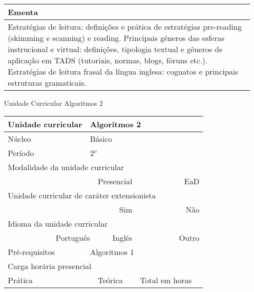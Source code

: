 \begin{quadro}[h!]
\begin{tabular}{|p{3cm} p{2cm} p{3cm} p{2cm} p{3cm} p{2cm}|}
\multicolumn{6}{|p{15cm}|}{\cellcolor{blue1} Ementa} \\\hline
\hline\multicolumn{6}{|p{15cm}|}{\scriptsize  Estratégias de leitura: definições e prática de estratégias pre-reading (skimming e scanning) e reading. Principais gêneros das esferas instrucional e virtual: definições, tipologia textual e gêneros de aplicação em TADS (tutoriais, normas, blogs, fóruns etc.).  Estratégias de leitura frasal da língua inglesa: cognatos e principais estruturas gramaticais.}\\\hline
\hline
	\end{tabular}
\end{quadro}
\begin{quadro}[h!]
  \centering\scriptsize
\caption{Unidade Curricular Algoritmos 2}
\label{ unit_6 }
\begin{tabular}{|p{3cm} p{2cm} p{3cm} p{2cm} p{3cm} p{2cm}|}\hline
\multicolumn{1}{|p{3cm}|}{\cellcolor{blue1} Unidade curricular} & \multicolumn{5}{p{9cm}|}{ Algoritmos 2 }\\\hline
\multicolumn{1}{|p{3cm}|}{\cellcolor{blue1} Núcleo} & \multicolumn{5}{p{11.5cm}|}{ Básico }\\\hline
\multicolumn{1}{|p{3cm}|}{\cellcolor{blue1} Período} & \multicolumn{5}{p{9cm}|}{ 2$^o$ }\\\hline
\multicolumn{6}{|p{15cm}|}{\cellcolor{blue1} Modalidade da unidade curricular} \\\hline
\multicolumn{2}{|r}{		} &  \multicolumn{2}{r}{Presencial \XBox } & \multicolumn{2}{r|}{EaD \Square	} \\\hline
\multicolumn{6}{|p{15cm}|}{\cellcolor{blue1} Unidade curricular de caráter extensionista} \\\hline
\multicolumn{4}{|r}{			Sim \Square	} & \multicolumn{2}{r|}{	Não \XBox	}\\\hline
\multicolumn{6}{|p{15cm}|}{\cellcolor{blue1} Idioma da unidade curricular} \\ \hline
\multicolumn{2}{|r}{	Português \XBox	} &  \multicolumn{2}{r}{	Inglês \Square	} & \multicolumn{2}{r|}{	Outro \Square	} \\ \hline
\multicolumn{1}{|p{3cm}|}{\cellcolor{blue1} Pré-requisitos} & \multicolumn{5}{p{9cm}|}{ Algoritmos 1 }\\ \hline
\multicolumn{6}{|p{15cm}|}{\cellcolor{blue1} Carga horária presencial} \\ \hline
\multicolumn{1}{|p{3cm}|}{\raggedleft Prática} & \multicolumn{1}{p{1cm}|}{\centering	30	} &  \multicolumn{1}{p{3cm}|}{\raggedleft Teórica}  & \multicolumn{1}{p{1cm}|}{\centering 	30 } & \multicolumn{1}{p{3cm}|}{\raggedleft Total em horas} & \multicolumn{1}{p{1cm}|}{\raggedleft	60	} \\ \hline

\end{tabular}
\end{quadro}
